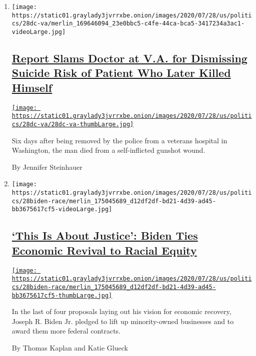 \begin{enumerate}
\def\labelenumi{\arabic{enumi}.}
\item
  \texttt{[image: https://static01.graylady3jvrrxbe.onion/images/2020/07/28/us/politics/28dc-va/merlin\_169646094\_23e0bbc5-c4fe-44ca-bca5-3417234a3ac1-videoLarge.jpg]}

  \hypertarget{report-slams-doctor-at-va-for-dismissing-suicide-risk-of-patient-who-later-killed-himself}{%
  \subsection{\texorpdfstring{\href{/2020/07/28/us/politics/veterans-suicide.html}{Report
  Slams Doctor at V.A. for Dismissing Suicide Risk of Patient Who Later
  Killed
  Himself}}{Report Slams Doctor at V.A. for Dismissing Suicide Risk of Patient Who Later Killed Himself}}\label{report-slams-doctor-at-va-for-dismissing-suicide-risk-of-patient-who-later-killed-himself}}

  \href{/2020/07/28/us/politics/veterans-suicide.html}{\texttt{[image: https://static01.graylady3jvrrxbe.onion/images/2020/07/28/us/politics/28dc-va/28dc-va-thumbLarge.jpg]}}

  Six days after being removed by the police from a veterans hospital in
  Washington, the man died from a self-inflicted gunshot wound.

  By Jennifer Steinhauer
\item
  \texttt{[image: https://static01.graylady3jvrrxbe.onion/images/2020/07/28/us/politics/28biden-race/merlin\_175045689\_d12df2df-bd21-4d39-ad45-bb3675617cf5-videoLarge.jpg]}

  \hypertarget{this-is-about-justice-biden-ties-economic-revival-to-racial-equity}{%
  \subsection{\texorpdfstring{\href{/2020/07/28/us/politics/joe-biden-racial-justice-economy-plan.html}{`This
  Is About Justice': Biden Ties Economic Revival to Racial
  Equity}}{`This Is About Justice': Biden Ties Economic Revival to Racial Equity}}\label{this-is-about-justice-biden-ties-economic-revival-to-racial-equity}}

  \href{/2020/07/28/us/politics/joe-biden-racial-justice-economy-plan.html}{\texttt{[image: https://static01.graylady3jvrrxbe.onion/images/2020/07/28/us/politics/28biden-race/merlin\_175045689\_d12df2df-bd21-4d39-ad45-bb3675617cf5-thumbLarge.jpg]}}

  In the last of four proposals laying out his vision for economic
  recovery, Joseph R. Biden Jr. pledged to lift up minority-owned
  businesses and to award them more federal contracts.

  By Thomas Kaplan and Katie Glueck
\end{enumerate}

